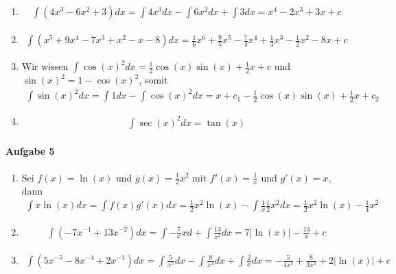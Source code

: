 \documentclass{article}
\begin{document}
\begin{enumerate}
    \item \begin{align*}
        \int(4x^3 - 6x^2 + 3)dx = \int 4x^3 dx - \int 6x^2 dx + \int 3 dx = x^4 - 2x^3 + 3x + c
    \end{align*}

    \item \begin{align*}
        \int(x^5 + 9x^4 - 7x^3 + x^2 - x - 8)dx = \frac{1}{6}x^6 + \frac{9}{5}x^5 - \frac{7}{4}x^4 + \frac{1}{3}x^3 - \frac{1}{2}x^{2} - 8x + c
    \end{align*}

    \item Wir wissen $\int \cos(x)^2 dx = \frac{1}{2} \cos(x)\sin(x) + \frac{1}{2}x + c$ und $\sin(x)^2 = 1 - \cos(x)^2$, somit
    \begin{align*}
        \int \sin(x)^2dx = \int 1dx - \int \cos(x)^2dx = x + c_1 - \frac{1}{2} \cos(x)\sin(x) + \frac{1}{2}x + c_2
    \end{align*}

    \item
    \begin{align*}
        \int \sec(x)^2dx = \tan(x)
    \end{align*}
\end{enumerate}

\paragraph{Aufgabe 5}

\begin{enumerate}
    \item Sei $f(x) = \ln(x)$ und $g(x) = \frac{1}{2}x^2$ mit $f'(x) = \frac{1}{x}$ und $g'(x) = x$, dann 
    \begin{align*}
        \int x\ln(x)dx = \int f(x)g'(x)dx = \frac{1}{2}x^2\ln(x) - \int \frac{1}{x} \frac{1}{2}x^2 dx = \frac{1}{2}x^2\ln(x) - \frac{1}{4}x^2
    \end{align*}

    \item \begin{align*}
        \int (-7x^{-1}+13x^{-2})dx = \int -\frac{7}{x}xd + \int \frac{13}{x^2}dx = 7|\ln(x)| - \frac{13}{x} + c
    \end{align*}

    \item \begin{align*}
        \int (5x^{-5} - 8x^{-4} + 2x^{-1})dx = \int \frac{5}{x^5}dx - \int\frac{8}{x^4}dx + \int\frac{2}{x}dx = -\frac{5}{4x^4} + \frac{8}{3x^3} + 2|\ln(x)| + c
    \end{align*}
\end{enumerate}
\end{document}
